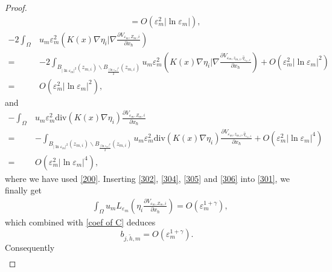 \documentclass[12pt,reqno]{amsart}
\numberwithin{equation}{section}
\theoremstyle{definition}
\theoremstyle{remark}
\begin{document}
\begin{proof}
\begin{equation}
\begin{array}{ll}
\qquad=O\left( \varepsilon_m^2|\ln\varepsilon_m|\right),
\end{array}
\end{equation}
\begin{equation}\label{305}
\begin{split}
-2\int_{\Omega}&u_m\varepsilon_m^2\left (K(x)\nabla\eta_i|\nabla   \frac{\partial V_{\varepsilon_m, Z_{m},i}}{\partial x_\hbar}  \right )\\
=&-2\int_{B_{|\ln\varepsilon_m|^{2}}(z_{m,i})\backslash B_{\frac{|\ln\varepsilon_m|^{2}}{2}}(z_{m,i})}u_m\varepsilon_m^2\left (K(x)\nabla\eta_i|\nabla   \frac{\partial V_{\varepsilon_m, z_{m,i},\hat{q}_{\varepsilon_m,i}}}{\partial x_\hbar}  \right )+O\left( \varepsilon_m^2|\ln\varepsilon_m|^{2}\right)\\
=&O\left( \varepsilon_m^2|\ln\varepsilon_m|^{2}\right),
\end{split}
\end{equation}
and
\begin{equation}\label{306}
\begin{split}
-\int_{\Omega}&u_m\varepsilon_m^2\text{div}\left (K(x)\nabla   \eta_i  \right )\frac{\partial V_{\varepsilon_m, Z_{m},i}}{\partial x_\hbar}\\
=&-\int_{B_{|\ln\varepsilon_m|^{2}}(z_{m,i})\backslash B_{\frac{|\ln\varepsilon_m|^{2}}{2}}(z_{m,i})}u_m\varepsilon_m^2\text{div}\left (K(x)\nabla   \eta_i  \right )\frac{\partial V_{\varepsilon_m, z_{m,i},\hat{q}_{\varepsilon_m,i}}}{\partial x_\hbar}+O\left( \varepsilon_m^2|\ln\varepsilon_m|^{4}\right)\\
=&O\left( \varepsilon_m^2|\ln\varepsilon_m|^{4}\right),
\end{split}
\end{equation}
where we have used \eqref{200}. Inserting \eqref{302}, \eqref{304}, \eqref{305} and \eqref{306} into \eqref{301}, we finally get
\begin{equation*}
\begin{split}
&\int_{\Omega}u_mL_{\varepsilon_m}\left( \eta_i\frac{\partial V_{\varepsilon_m, Z_{m},i}}{\partial x_\hbar}\right) =O\left( \varepsilon_m^{1+\gamma}\right),
\end{split}
\end{equation*}
which combined with \eqref{coef of C} deduces
\begin{equation*}
b_{j,\tilde{h},m}=O\left (\varepsilon_m^{1+\gamma}\right ).
\end{equation*}
Consequently
\begin{equation*}
\begin{split}

\end{split}
\end{equation*}
\end{proof}
\end{document}
